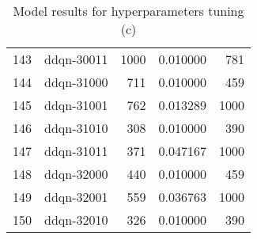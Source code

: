 \documentclass{article}
\begin{document}
\begin{table}
\begin{tabular}{llrrr}
143 &           ddqn-30011 &            1000 &   0.010000 &               781 \\
144 &           ddqn-31000 &             711 &   0.010000 &               459 \\
145 &           ddqn-31001 &             762 &   0.013289 &              1000 \\
146 &           ddqn-31010 &             308 &   0.010000 &               390 \\
147 &           ddqn-31011 &             371 &   0.047167 &              1000 \\
148 &           ddqn-32000 &             440 &   0.010000 &               459 \\
149 &           ddqn-32001 &             559 &   0.036763 &              1000 \\
150 &           ddqn-32010 &             326 &   0.010000 &               390 \\
\bottomrule
\end{tabular}
\label{table:res_basecase}
\caption{Model results for hyperparameters tuning (c)}
\end{table}
\end{document}
